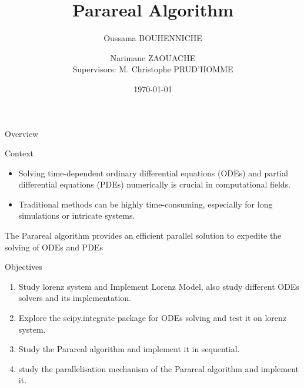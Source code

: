 \documentclass[aspectratio=169,xcolor=dvipsnames, t]{beamer}
\title[Parareal Algorithm]{Parareal Algorithm}
\author[O. BOUHENNICHE \and N. ZAOUACHE]{Oussama BOUHENNICHE \and Narimane ZAOUACHE \\[5mm]{\small Supervisors: M. Christophe PRUD’HOMME}}
\institute[]{University of Strasbourg}
\date{\today} %
\begin{document}
\maketitlepage

\begin{frame}[t]{Overview}
    \tableofcontents
\end{frame}


\begin{frame}{Context}
    \begin{itemize}
        \item Solving time-dependent ordinary differential equations (ODEs) and partial differential equations (PDEs) numerically is crucial in computational fields.
        \item Traditional methods can be highly time-consuming, especially for long simulations or intricate systems.
    \end{itemize}
\begin{block}{}
    The Parareal algorithm  provides an efficient parallel solution to expedite the solving of ODEs and PDEs
\end{block}
\end{frame}

\begin{frame}{Objectives}
    \begin{enumerate}
        \item Study lorenz system  and Implement Lorenz Model, also study different ODEs solvers and its implementation.
        \item Explore the scipy.integrate  package for ODEs solving and test it on lorenz system.
        \item Study the Parareal algorithm and implement it in sequential.
        \item study the parallelisation mechanism of the Parareal algorithm and implement it.
    \end{enumerate}
\end{frame}

\end{document}
